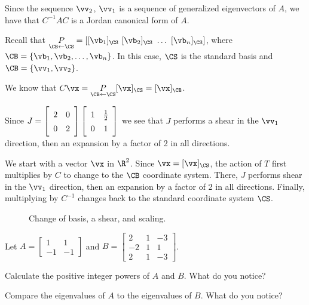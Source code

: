\ActivitySolution
\ba
\item Since the sequence $\vv_2$, $\vv_1$ is a sequence of generalized eigenvectors of $A$, we have that $C^{-1}AC$ is a Jordan canonical form of $A$.

\item Recall that $\underset{\CB \leftarrow \CS}{P} = [[\vb_1]_{\CS}  \ [\vb_2]_{\CS} \ \ldots \ [\vb_n]_{\CS}]$, where $\CB = \{\vb_1, \vb_2, \ldots, \vb_n\}$. In this case, $\CS$ is the standard basis and $\CB = \{\vv_1, \vv_2\}$. 

\item We know that $C\vx = \underset{\CB \leftarrow \CS}{P}[\vx]_{\CS} = [\vx]_{\CB}$. 

\item Since $J =  \left[ \begin{array}{cc} 2&0\\0&2 \end{array} \right]  \left[ \renewcommand{\arraystretch}{1.4}\begin{array}{cc} 1&\frac{1}{2}\\0&1 \end{array} \right]$ we see that $J$ performs a shear in the $\vv_1$ direction, then an expansion by a factor of 2 in all directions.

\item  We start with a vector $\vx$ in $\R^2$. Since $\vx = [\vx]_{\CS}$, the action of $T$ first multiplies by $C$ to change to the $\CB$ coordinate system. There, $J$ performs shear in the $\vv_1$ direction, then an expansion by a factor of 2 in all directions. Finally, multiplying by $C^{-1}$ changes back to the standard coordinate system $\CS$. 
 
\ea

\begin{figure}[ht]
\begin{center}
\end{center}
\caption{Change of basis, a shear, and scaling.}
\label{F:JCF_shear_3}
\end{figure}

 
\begin{activity} \label{act:nilpotent_intro} Let $A = \left[ \begin{array}{rr} 1&1\\-1&-1 \end{array} \right]$ and $B = \left[ \begin{array}{rcr} 2&1&-3 \\ -2&1&1 \\ 2&1&-3 \end{array} \right]$.  
\ba
\item Calculate the positive integer powers of $A$ and $B$. What do you notice?

\item Compare the eigenvalues of $A$ to the eigenvalues of $B$. What do you notice?

\ea
\end{activity}

